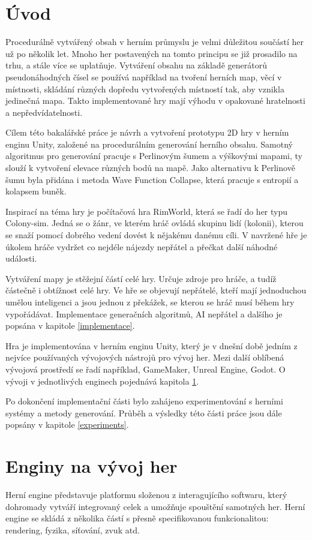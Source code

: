 
\chapter*{Úvod}
Procedurálně vytvářený obsah v herním průmyslu je velmi důležitou součástí her už po několik let. Mnoho her postavených na tomto principu se již prosadilo na trhu, a stále více se uplatňuje. Vytváření obsahu na základě generátorů pseudonáhodných čísel se používá například na tvoření herních map, věcí v místnosti, skládání různých dopředu vytvořených místností tak, aby vznikla jedinečná mapa. Takto implementované hry mají výhodu v opakované hratelnosti a nepředvídatelnosti.

Cílem této bakalářské práce je návrh a vytvoření prototypu 2D hry v herním enginu Unity, založené na procedurálním generování herního obsahu. Samotný algoritmus pro generování pracuje s Perlinovým šumem a výškovými mapami, ty slouží k vytvoření elevace různých bodů na mapě. Jako alternativu k Perlinově šumu byla přidána i metoda Wave Function Collapse, která pracuje s entropií a kolapsem buněk.

Inspirací na téma hry je počítačová hra RimWorld, která se řadí do her typu Colony-sim. Jedná se o žánr, ve kterém hráč ovládá skupinu lidí (kolonii), kterou se snaží pomocí dobrého vedení dovést k nějakému danému cíli. V navržené hře je úkolem hráče vydržet co nejdéle nájezdy nepřátel a přečkat další náhodné události.

Vytváření mapy je stěžejní částí celé hry. Určuje zdroje pro hráče, a tudíž částečně i obtížnost celé hry. Ve hře se objevují nepřátelé, kteří mají jednoduchou umělou inteligenci a jsou jednou z překážek, se kterou se hráč musí během hry vypořádávat. Implementace generačních algoritmů, AI nepřátel a dalšího je popsána v kapitole \ref{implementace}.

Hra je implementována v herním enginu Unity, který je v dnešní době jedním z nejvíce používaných vývojových nástrojů pro vývoj her. Mezi další oblíbená vývojová prostředí se řadí například, GameMaker, Unreal Engine, Godot. O vývoji v jednotlivých enginech pojednává kapitola \ref{engines}.

Po dokončení implementační části bylo zahájeno experimentování s herními systémy a metody generování. Průběh a výsledky této části práce jsou dále popsány v kapitole \ref{experiments}.

\newpage

\chapter{Enginy na vývoj her}
\label{engines}
Herní engine představuje platformu složenou z interagujícího softwaru, který dohromady vytváří integrovaný celek a umožňuje spouštění samotných her. Herní engine se skládá z několika částí s přesně specifikovanou funkcionalitou: rendering, fyzika, síťování, zvuk atd.~\cite{nilson2007game} 

